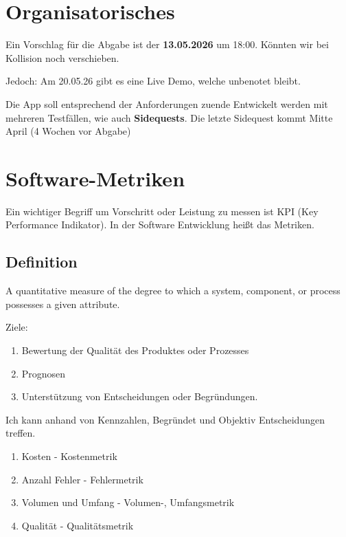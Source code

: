 \documentclass[a4paper]{article}
\title{\docTitle}
\author{Moritz}
\date{\today}
\begin{document}
\maketitle
\tableofcontents


\section{Organisatorisches}

Ein Vorschlag für die Abgabe ist der \textbf{13.05.2026} um 18:00. Könnten wir bei Kollision noch verschieben.

Jedoch: Am 20.05.26 gibt es eine Live Demo, welche unbenotet bleibt.

Die App soll entsprechend der Anforderungen zuende Entwickelt werden mit mehreren Testfällen, wie auch \textbf{Sidequests}. Die letzte Sidequest kommt Mitte April (4 Wochen vor Abgabe)

\section{Software-Metriken}


Ein wichtiger Begriff um Vorschritt oder Leistung zu messen ist KPI (Key Performance Indikator). In der Software Entwicklung heißt das Metriken.

\subsection{Definition}

A quantitative measure of the degree to which a system, component, or process possesses a given attribute.

Ziele:

\begin{enumerate}
    \item Bewertung der Qualität des Produktes oder Prozesses
    \item Prognosen
    \item Unterstützung von Entscheidungen oder Begründungen.
\end{enumerate}

Ich kann anhand von Kennzahlen, Begründet und Objektiv Entscheidungen treffen.

\begin{enumerate}
    \item Kosten - Kostenmetrik
    \item Anzahl Fehler - Fehlermetrik
    \item Volumen und Umfang - Volumen-, Umfangsmetrik
    \item Qualität - Qualitätsmetrik
\end{enumerate}
\end{document}
